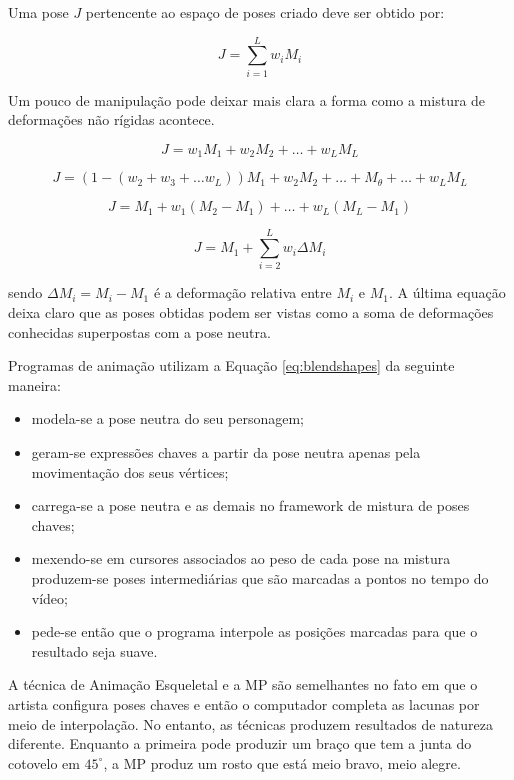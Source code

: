 {    Uma pose $J$ pertencente ao espaço de poses criado deve ser obtido por:    

\begin{equation}
    	J = \sum_{i=1}^L  w_i M_i
        \label{eq:J-mistura}
\end{equation}

Um pouco de manipulação pode deixar mais clara a forma como a mistura de deformações não rígidas acontece.

\begin{equation}
    	J = w_1 M_1 + w_2 M_2 + \ldots + w_L M_L
\end{equation}

\begin{equation}
    	J = (1-(w_2 + w_3 + \ldots w_L)) M_1 + w_2 M_2 + \ldots + M_\theta + \ldots + w_L M_L
\end{equation}

\begin{equation}
    	J = M_1 + w_1(M_2 - M_1) + \ldots + w_L (M_L - M_1)
\end{equation}

\begin{equation}
    	J = M_1 + \sum_{i = 2}^L w_i \Delta M_i
        \label{eq:blendshapes}
\end{equation}

sendo $\Delta M_i = M_i - M_1$ é a deformação relativa entre $M_i$ e $M_1$. A última equação deixa claro que as poses obtidas podem ser vistas como a soma de deformações conhecidas superpostas com a pose neutra. 

Programas de animação utilizam a Equação \ref{eq:blendshapes} da seguinte maneira: 
\begin{itemize}

	\item modela-se a pose neutra do seu personagem; 
    \item geram-se expressões chaves a partir da pose neutra apenas pela movimentação dos seus vértices;
    \item carrega-se a pose neutra e as demais no framework de mistura de poses chaves;
    \item mexendo-se em cursores associados ao peso de cada pose na mistura produzem-se  poses intermediárias que são marcadas a pontos no tempo do vídeo;
    \item pede-se então que o programa interpole as posições marcadas para que o resultado seja suave.
\end{itemize}

A técnica de Animação Esqueletal e a MP são semelhantes no fato em que o artista configura poses chaves e então o computador completa as lacunas por meio de interpolação. No entanto, as técnicas produzem resultados de natureza diferente. Enquanto a primeira pode produzir um braço que tem a junta do cotovelo em $45^\circ$, a MP produz um rosto que está meio bravo, meio alegre.

}
